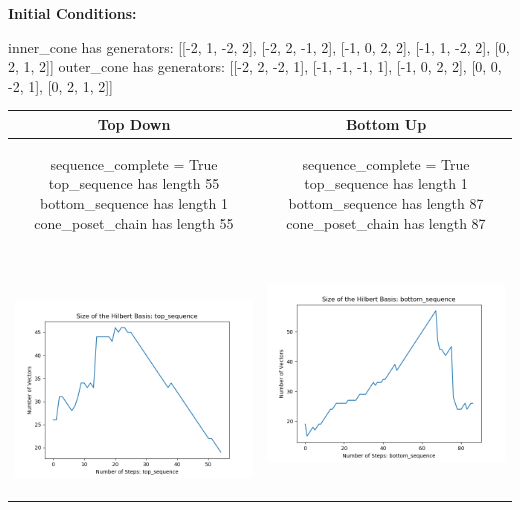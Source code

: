 \documentclass[10pt]{article}
\begin{document}
\textbf{Initial Conditions:}
\begin{SAGE}
inner_cone has generators: 
[[-2, 1, -2, 2], [-2, 2, -1, 2], [-1, 0, 2, 2], [-1, 1, -2, 2], [0, 2, 1, 2]]
outer_cone has generators: 
[[-2, 2, -2, 1], [-1, -1, -1, 1], [-1, 0, 2, 2], [0, 0, -2, 1], [0, 2, 1, 2]]

\end{SAGE}
\begin{tabular}{c|c}
\textbf{Top Down} & \textbf{Bottom Up} \\ \hline  
\begin{SAGE}
	sequence_complete = True
	top_sequence has length 55
	bottom_sequence has length 1
	cone_poset_chain has length 55
\end{SAGE} 
&
\begin{SAGE}
	sequence_complete = True
	top_sequence has length 1
	bottom_sequence has length 87
	cone_poset_chain has length 87
\end{SAGE} 
\\ \hline
\
\begin{minipage}{.45\textwidth}
\includegraphics[width=\textwidth]{"DATA/4d/5 generators 2 bound H/top_sequence SIZE"}
\end{minipage} &
\begin{minipage}{.45\textwidth}
\includegraphics[width=\textwidth]{"DATA/4d/5 generators 2 bound H bottomup/bottom_sequence SIZE"}

\end{minipage}
\end{tabular}
\end{document}

